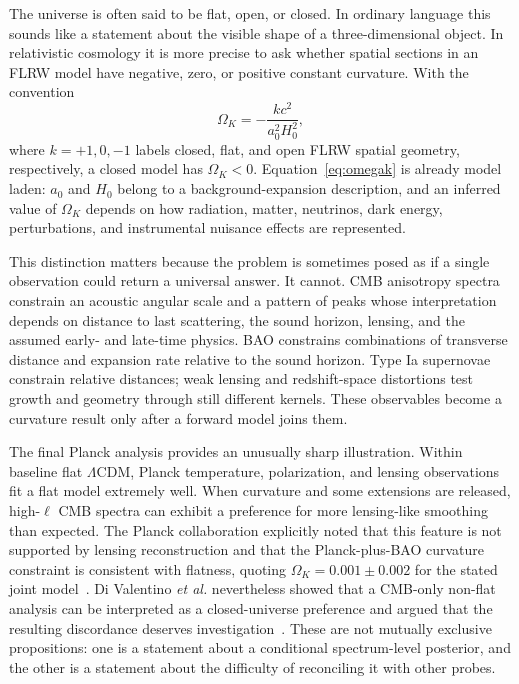 \documentclass[conference]{IEEEtran}
\newcommand{\ok}{\ensuremath{\Omega_K}}
\newcommand{\lcdm}{\ensuremath{\Lambda\mathrm{CDM}}}
\begin{document}
The universe is often said to be flat, open, or closed. In ordinary language this sounds like a statement about the visible shape of a three-dimensional object. In relativistic cosmology it is more precise to ask whether spatial sections in an FLRW model have negative, zero, or positive constant curvature. With the convention
\begin{equation}
\ok=-\frac{k c^2}{a_0^2H_0^2},
\label{eq:omegak}
\end{equation}
where $k=+1,0,-1$ labels closed, flat, and open FLRW spatial geometry, respectively, a closed model has $\ok<0$. Equation~\eqref{eq:omegak} is already model laden: $a_0$ and $H_0$ belong to a background-expansion description, and an inferred value of $\ok$ depends on how radiation, matter, neutrinos, dark energy, perturbations, and instrumental nuisance effects are represented.

This distinction matters because the problem is sometimes posed as if a single observation could return a universal answer. It cannot. CMB anisotropy spectra constrain an acoustic angular scale and a pattern of peaks whose interpretation depends on distance to last scattering, the sound horizon, lensing, and the assumed early- and late-time physics. BAO constrains combinations of transverse distance and expansion rate relative to the sound horizon. Type Ia supernovae constrain relative distances; weak lensing and redshift-space distortions test growth and geometry through still different kernels. These observables become a curvature result only after a forward model joins them.

The final Planck analysis provides an unusually sharp illustration. Within baseline flat \lcdm, Planck temperature, polarization, and lensing observations fit a flat model extremely well. When curvature and some extensions are released, high-$\ell$ CMB spectra can exhibit a preference for more lensing-like smoothing than expected. The Planck collaboration explicitly noted that this feature is not supported by lensing reconstruction and that the Planck-plus-BAO curvature constraint is consistent with flatness, quoting $\ok=0.001\pm0.002$ for the stated joint model~\cite{planck18}. Di Valentino \emph{et al.} nevertheless showed that a CMB-only non-flat analysis can be interpreted as a closed-universe preference and argued that the resulting discordance deserves investigation~\cite{dival19}. These are not mutually exclusive propositions: one is a statement about a conditional spectrum-level posterior, and the other is a statement about the difficulty of reconciling it with other probes.
\end{document}
